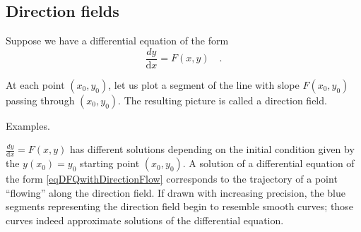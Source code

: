 \documentclass[12pt]{book}
\newcommand{\diff}{\text{d}}
\newcommand{\optionalDisplay}[1]{}
\begin{document}
\subsection{Direction fields}
Suppose we have a differential equation of the form 
\begin{equation}\label{eqDFQwithDirectionFlow}
\frac{dy}{\diff x}= F(x,y)\quad.  
\end{equation}

At each point $(x_0,y_0)$, let us plot a segment of the line with slope $F(x_0,y_0)$ passing through $(x_0,y_0)$. The resulting picture is called a direction field. 

Examples.

\optionalDisplay{
\psset{xunit=1cm,yunit=1cm}
\SpecialCoor
\begin{pspicture}(-5,-5)(5,5)
\psaxes{<->}(0,0)(-5,-5)(5,5)
\rput (5,5){The direction field $\frac{dy}{\diff x}=xy$}
  \psset{arrows=->}
  \multido{\ra=-4+0.5}{17}{%
    \multido{\rb=-4+0.5}{17}{%
      \pstVerb{/xC \ra\space def
               /yC \rb\space def
               /F xC  yC mul \space def
}
\psdot[linecolor=red!60](! xC yC)
\psline[linecolor=blue](! xC F ATAN 57.295 mul cos 0.2 mul sub yC F ATAN 57.295 mul sin 0.2 mul sub)(! xC F ATAN 57.295 mul cos 0.2 mul add yC F ATAN 57.295 mul sin 0.2 mul add )
}}
\end{pspicture}

\begin{pspicture}(-5,-5)(5,5)
\psaxes{<->}(0,0)(-5,-6)(5,5)
\rput (5,5){The direction field $\frac{dy}{\diff x}=x+y$}
  \psset{arrows=->}
  \multido{\ra=-4+0.5}{17}{%
    \multido{\rb=-4+0.5}{17}{%
      \pstVerb{/xC \ra\space def
               /yC \rb\space def
               /F xC  yC add \space def
}
\psdot[linecolor=red!60](! xC yC)
\psline[linecolor=blue](! xC F ATAN 57.295 mul cos 0.2 mul sub yC F ATAN 57.295 mul sin 0.2 mul sub)(! xC F ATAN 57.295 mul cos 0.2 mul add yC F ATAN 57.295 mul sin 0.2 mul add )
}}
\end{pspicture}
}%

$\frac{dy}{\diff x}= F(x,y)$ has different solutions depending on the initial condition given by the $y(x_0)=y_0$ starting point $(x_0, y_0)$. A solution of a differential equation of the form \eqref{eqDFQwithDirectionFlow} corresponds to the trajectory of a point ``flowing'' along the direction field. If drawn with increasing precision, the blue segments representing the direction field begin to resemble smooth curves; those curves indeed approximate solutions of the differential equation.
\end{document}
